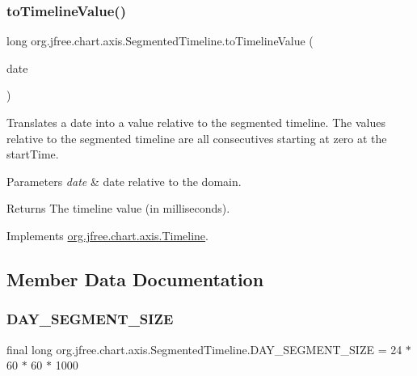 \subsubsection{\texorpdfstring{to\+Timeline\+Value()}{toTimelineValue()}\hspace{0.1cm}{\footnotesize\ttfamily [2/2]}}
{\footnotesize\ttfamily long org.\+jfree.\+chart.\+axis.\+Segmented\+Timeline.\+to\+Timeline\+Value (\begin{DoxyParamCaption}\item[{Date}]{date }\end{DoxyParamCaption})}

Translates a date into a value relative to the segmented timeline. The values relative to the segmented timeline are all consecutives starting at zero at the start\+Time.


\begin{DoxyParams}{Parameters}
{\em date} & date relative to the domain.\\
\hline
\end{DoxyParams}
\begin{DoxyReturn}{Returns}
The timeline value (in milliseconds). 
\end{DoxyReturn}


Implements \mbox{\hyperlink{interfaceorg_1_1jfree_1_1chart_1_1axis_1_1_timeline_aadc67523764fdacdc35bd6aa816c87a7}{org.\+jfree.\+chart.\+axis.\+Timeline}}.



\subsection{Member Data Documentation}
\mbox{\label{classorg_1_1jfree_1_1chart_1_1axis_1_1_segmented_timeline_a6ac56fcd3db1c4c7470a7278eb8e80e3}} 
\subsubsection{\texorpdfstring{D\+A\+Y\+\_\+\+S\+E\+G\+M\+E\+N\+T\+\_\+\+S\+I\+ZE}{DAY\_SEGMENT\_SIZE}}
{\footnotesize\ttfamily final long org.\+jfree.\+chart.\+axis.\+Segmented\+Timeline.\+D\+A\+Y\+\_\+\+S\+E\+G\+M\+E\+N\+T\+\_\+\+S\+I\+ZE = 24 $\ast$ 60 $\ast$ 60 $\ast$ 1000\hspace{0.3cm}{\ttfamily [static]}}

